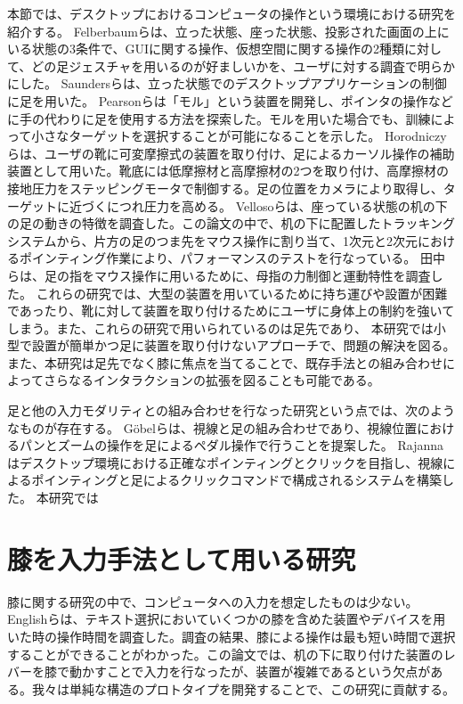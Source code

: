 本節では、デスクトップにおけるコンピュータの操作という環境における研究を紹介する。
Felberbaumら\cite{Felberbaum:2018:BUF:3173574.3173908}は、立った状態、座った状態、投影された画面の上にいる状態の3条件で、GUIに関する操作、仮想空間に関する操作の2種類に対して、どの足ジェスチャを用いるのが好ましいかを、ユーザに対する調査で明らかにした。
Saundersら\cite{Saunders:2016:TFI:2901790.2901815}は、立った状態でのデスクトップアプリケーションの制御に足を用いた。
Pearsonら\cite{Pearson:1986:MMD:22627.22392, Pearson:1988:EET:49108.1046356}は「モル」という装置を開発し、ポインタの操作などに手の代わりに足を使用する方法を探索した。モルを用いた場合でも、訓練によって小さなターゲットを選択することが可能になることを示した。
Horodniczyら\cite{Horodniczy:2017:FHE:3025453.3025625}は、ユーザの靴に可変摩擦式の装置を取り付け、足によるカーソル操作の補助装置として用いた。靴底には低摩擦材と高摩擦材の2つを取り付け、高摩擦材の接地圧力をステッピングモータで制御する。足の位置をカメラにより取得し、ターゲットに近づくにつれ圧力を高める。
Vellosoら\cite{velloso:hal-01599657}は、座っている状態の机の下の足の動きの特徴を調査した。この論文の中で、机の下に配置したトラッキングシステムから、片方の足のつま先をマウス操作に割り当て、1次元と2次元におけるポインティング作業により、パフォーマンスのテストを行なっている。
田中ら\cite{110004704997}は、足の指をマウス操作に用いるために、母指の力制御と運動特性を調査した。
これらの研究では、大型の装置を用いているために持ち運びや設置が困難であったり、靴に対して装置を取り付けるためにユーザに身体上の制約を強いてしまう。また、これらの研究で用いられているのは足先であり、
本研究では小型で設置が簡単かつ足に装置を取り付けないアプローチで、問題の解決を図る。また、本研究は足先でなく膝に焦点を当てることで、既存手法との組み合わせによってさらなるインタラクションの拡張を図ることも可能である。

足と他の入力モダリティとの組み合わせを行なった研究という点では、次のようなものが存在する。
G\"{o}belら\cite{Gobel:2013:GFI:2468356.2479610}は、視線と足の組み合わせであり、視線位置におけるパンとズームの操作を足によるペダル操作で行うことを提案した。
Rajanna\cite{Rajanna:2016:GFI:2876456.2876462}はデスクトップ環境における正確なポインティングとクリックを目指し、視線によるポインティングと足によるクリックコマンドで構成されるシステムを構築した。
本研究では


\section{膝を入力手法として用いる研究}
膝に関する研究の中で、コンピュータへの入力を想定したものは少ない。
Englishら\cite{1698228}は、テキスト選択においていくつかの膝を含めた装置やデバイスを用いた時の操作時間を調査した。調査の結果、膝による操作は最も短い時間で選択することができることがわかった。この論文では、机の下に取り付けた装置のレバーを膝で動かすことで入力を行なったが、装置が複雑であるという欠点がある。我々は単純な構造のプロトタイプを開発することで、この研究に貢献する。




